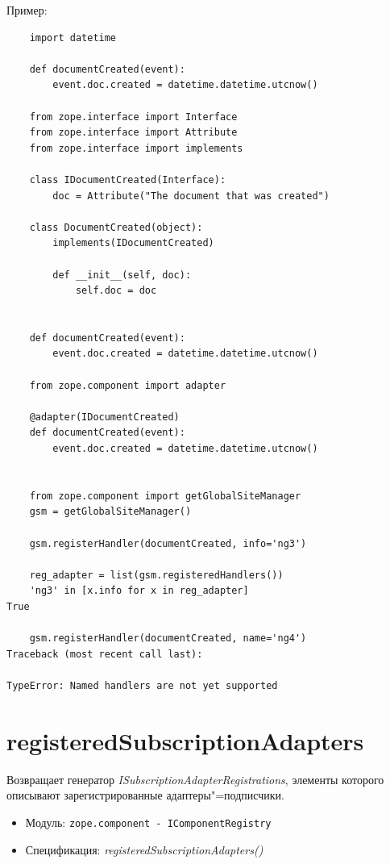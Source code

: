 \documentclass[a4paper,openany,twoside,draft]{book}
\providecommand*{\DUroletitlereference}[1]{\textsl{#1}}
\begin{document}
Пример:

\begin{verbatim}
    import datetime

    def documentCreated(event):
        event.doc.created = datetime.datetime.utcnow()

    from zope.interface import Interface
    from zope.interface import Attribute
    from zope.interface import implements

    class IDocumentCreated(Interface):
        doc = Attribute("The document that was created")

    class DocumentCreated(object):
        implements(IDocumentCreated)

        def __init__(self, doc):
            self.doc = doc


    def documentCreated(event):
        event.doc.created = datetime.datetime.utcnow()

    from zope.component import adapter

    @adapter(IDocumentCreated)
    def documentCreated(event):
        event.doc.created = datetime.datetime.utcnow()


    from zope.component import getGlobalSiteManager
    gsm = getGlobalSiteManager()

    gsm.registerHandler(documentCreated, info='ng3')

    reg_adapter = list(gsm.registeredHandlers())
    'ng3' in [x.info for x in reg_adapter]
True

    gsm.registerHandler(documentCreated, name='ng4')
Traceback (most recent call last):

TypeError: Named handlers are not yet supported
\end{verbatim}


\section*{registeredSubscriptionAdapters%
  \label{registeredsubscriptionadapters}%
}

Возвращает генератор \DUroletitlereference{ISubscriptionAdapterRegistrations}, элементы которого описывают зарегистрированные адаптеры"=подписчики.

\begin{itemize}

\item Модуль: \texttt{zope.component - IComponentRegistry}

\item Спецификация: \DUroletitlereference{registeredSubscriptionAdapters()}

\end{itemize}
\end{document}
